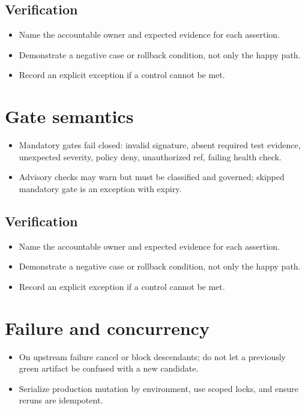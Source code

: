 \documentclass[10pt,letterpaper]{article}
\begin{document}
\subsection{Verification}
\begin{itemize}
\item Name the accountable owner and expected evidence for each assertion.
\item Demonstrate a negative case or rollback condition, not only the happy path.
\item Record an explicit exception if a control cannot be met.
\end{itemize}


\section{Gate semantics}
\begin{itemize}
\item Mandatory gates fail closed: invalid signature, absent required test evidence, unexpected severity, policy deny, unauthorized ref, failing health check.
\item Advisory checks may warn but must be classified and governed; skipped mandatory gate is an exception with expiry.
\end{itemize}
\subsection{Verification}
\begin{itemize}
\item Name the accountable owner and expected evidence for each assertion.
\item Demonstrate a negative case or rollback condition, not only the happy path.
\item Record an explicit exception if a control cannot be met.
\end{itemize}


\section{Failure and concurrency}
\begin{itemize}
\item On upstream failure cancel or block descendants; do not let a previously green artifact be confused with a new candidate.
\item Serialize production mutation by environment, use scoped locks, and ensure reruns are idempotent.
\end{itemize}
\end{document}
